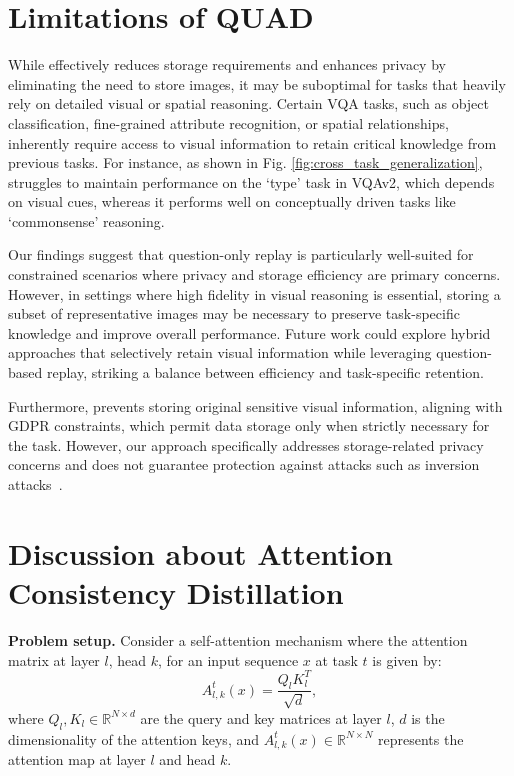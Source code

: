 \section{Limitations of QUAD} 
\label{sec.limitations}
While \qstmethodshort{} effectively reduces storage requirements and enhances privacy by eliminating the need to store images, it may be suboptimal for tasks that heavily rely on detailed visual or spatial reasoning. Certain VQA tasks, such as object classification, fine-grained attribute recognition, or spatial relationships, inherently require access to visual information to retain critical knowledge from previous tasks. For instance, as shown in Fig. \ref{fig:cross_task_generalization}, \qstmethodshort{} struggles to maintain performance on the `type' task in VQAv2, which depends on visual cues, whereas it performs well on conceptually driven tasks like `commonsense' reasoning.  

Our findings suggest that question-only replay is particularly well-suited for constrained scenarios where privacy and storage efficiency are primary concerns. However, in settings where high fidelity in visual reasoning is essential, storing a subset of representative images may be necessary to preserve task-specific knowledge and improve overall performance. Future work could explore hybrid approaches that selectively retain visual information while leveraging question-based replay, striking a balance between efficiency and task-specific retention.

Furthermore, \qstmethodshort{} prevents storing original sensitive visual information, aligning with GDPR constraints, which permit data storage only when strictly necessary for the task. However, our approach specifically addresses storage-related privacy concerns and does not guarantee protection against attacks such as inversion attacks~\cite{dibbo2023sok, zhang2020privacy}.

\section{Discussion about Attention Consistency Distillation}
\label{sec.acdvsl1}
\noindent\textbf{Problem setup. }Consider a self-attention mechanism where the attention matrix at layer \( l \), head \( k \), for an input sequence \( x \) at task \( t \) is given by:
\begin{equation}
A_{l, k}^{t}(x) = \frac{Q_l K_l^T}{\sqrt{d}},
\end{equation}
where \( Q_l, K_l \in \mathbb{R}^{N \times d} \) are the query and key matrices at layer \( l \), \( d \) is the dimensionality of the attention keys, and \( A_{l, k}^{t}(x) \in \mathbb{R}^{N \times N} \) represents the attention map at layer \( l \) and head \( k \).

